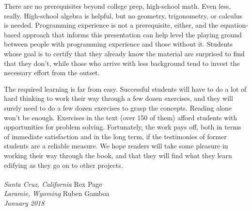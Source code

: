 There are no prerequisites beyond college prep, high-school math.
Even less, really.
High-school algebra is helpful,
but no geometry, trigonometry, or calculus is needed.
Programming experience is not a prerequisite, either, and
the equation-based approach that informs this presentation can
help level the playing ground between people
with programming experience and those without it.
Students whose goal is to certify that they already
know the material are surprised to find that they don't,
while those who arrive with less background tend
to invest the necessary effort from the outset.

The required learning is far from easy.
Successful students will have to do a lot of hard thinking
to work their way through a few dozen exercises,
and they will surely need to do a few dozen exercises to grasp the concepts.
Reading alone won't be enough.
Exercises in the text (over 150 of them) afford students with opportunities
for problem solving.
Fortunately, the work pays off, both in terms of immediate satisfaction
and in the long term, if the testimonies of former students are a
reliable measure.
We hope readers will take some pleasure in working their way through
the book, and that they will find what they learn
edifying as they go on to other projects.
\\
\\
\emph{Santa Cruz, California}   \hfill Rex Page     \\
\emph{Laramie, Wyoming}         \hfill Ruben Gamboa \\
\emph{January 2018}

